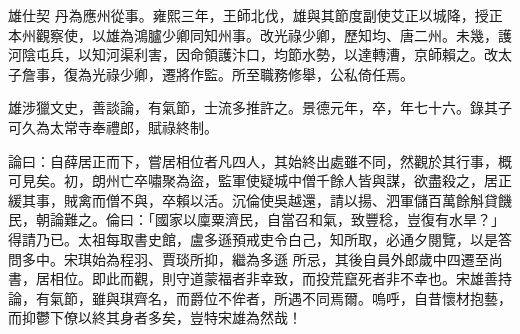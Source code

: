 \begin{pinyinscope}
 雄仕契
 丹為應州從事。雍熙三年，王師北伐，雄與其節度副使艾正以城降，授正本州觀察使，以雄為鴻臚少卿同知州事。改光祿少卿，歷知均、唐二州。未幾，護河陰屯兵，以知河渠利害，因命領護汴口，均節水勢，以達轉漕，京師賴之。改太子詹事，復為光祿少卿，遷將作監。所至職務修舉，公私倚任焉。



 雄涉獵文史，善談論，有氣節，士流多推許之。景德元年，卒，年七十六。錄其子可久為太常寺奉禮郎，賦祿終制。



 論曰：自薛居正而下，嘗居相位者凡四人，其始終出處雖不同，然觀於其行事，概可見矣。初，朗州亡卒嘯聚為盜，監軍使疑城中僧千餘人皆與謀，欲盡殺之，居正緩其事，賊禽而僧不與，卒賴以活。沉倫使吳越還，請以揚、泗軍儲百萬餘斛貸饑民，朝論難之。倫曰：「國家以廩粟濟民，自當召和氣，致豐稔，豈復有水旱？」得請乃已。太祖每取書史館，盧多遜預戒吏令白己，知所取，必通夕閱覽，以是答問多中。宋琪始為程羽、賈琰所抑，繼為多遜
 所忌，其後自員外郎歲中四遷至尚書，居相位。即此而觀，則守道蒙福者非幸致，而投荒竄死者非不幸也。宋雄善持論，有氣節，雖與琪齊名，而爵位不侔者，所遇不同焉爾。嗚呼，自昔懷材抱藝，而抑鬱下僚以終其身者多矣，豈特宋雄為然哉！



\end{pinyinscope}
